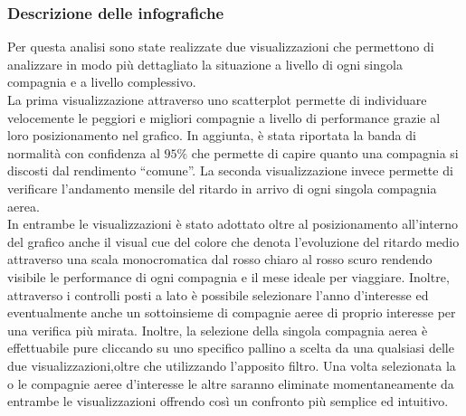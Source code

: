 \documentclass[12pt]{article}
\begin{document}
\subsubsection{Descrizione delle infografiche}
Per questa analisi sono state realizzate due visualizzazioni che permettono di analizzare in modo più dettagliato la situazione a livello di ogni singola compagnia e a livello complessivo.\\
La prima visualizzazione attraverso uno scatterplot permette di individuare velocemente le peggiori e migliori compagnie a livello di performance grazie al loro posizionamento nel grafico. In aggiunta, è stata riportata la banda di normalità con confidenza al $95\%$ che permette di capire quanto una compagnia si discosti dal rendimento ``comune''.
La seconda visualizzazione invece permette di verificare l'andamento mensile del ritardo in arrivo di ogni singola compagnia aerea.\\
In entrambe le visualizzazioni è stato adottato oltre al posizionamento all'interno del grafico anche il visual cue del colore che denota l'evoluzione del ritardo medio attraverso una scala monocromatica dal rosso chiaro al rosso scuro rendendo visibile le performance di ogni compagnia e il mese ideale per viaggiare. Inoltre, attraverso i controlli posti a lato è possibile selezionare l'anno d'interesse ed eventualmente anche un sottoinsieme di compagnie aeree di proprio interesse per una verifica più mirata. Inoltre, la selezione della singola compagnia aerea è effettuabile pure cliccando su uno specifico pallino a scelta da una qualsiasi delle due visualizzazioni,oltre che utilizzando l'apposito filtro. Una volta selezionata la o le compagnie aeree d'interesse le altre saranno eliminate momentaneamente da entrambe le visualizzazioni offrendo così un confronto più semplice ed intuitivo.
\end{document}
